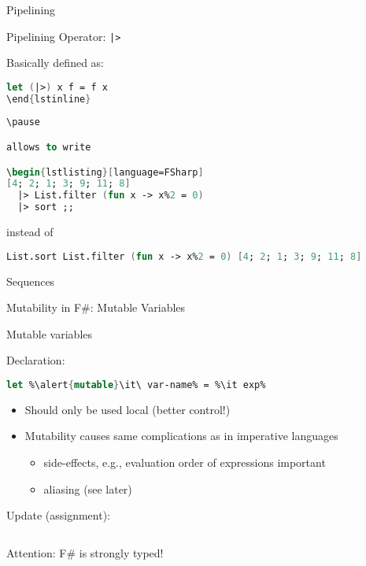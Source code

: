 \documentclass{beamer}
\newcommand{\Blue}[1]{\color{blue}#1\color{black}}
\begin{document}
\begin{frame}[fragile]{Pipelining}

Pipelining Operator: \lstinline!|>!

Basically defined as:
\begin{lstlisting}[language=FSharp]
let (|>) x f = f x 
\end{lstinline}
 
\pause

allows to write

\begin{lstlisting}[language=FSharp]
[4; 2; 1; 3; 9; 11; 8] 
  |> List.filter (fun x -> x%2 = 0) 
  |> sort ;;
\end{lstlisting}

instead of

\begin{lstlisting}[language=FSharp]
List.sort List.filter (fun x -> x%2 = 0) [4; 2; 1; 3; 9; 11; 8]
\end{lstlisting}
\end{frame}

\begin{frame}{Sequences}
\end{frame}



\begin{frame}[fragile]{Mutability in F\#: Mutable Variables}

\Blue{Mutable variables}

Declaration:

\begin{lstlisting}[language=FSharp, escapechar=\%]
             let %\alert{mutable}\it\ var-name% = %\it exp% 
\end{lstlisting}

\begin{itemize}
\item Should only be used local (better control!)
\item Mutability causes same complications as in imperative languages
  \begin{itemize}
    \item side-effects, e.g., evaluation order of expressions important
    \item aliasing (see later)
   \end{itemize}
\end{itemize}

\pause 

Update (assignment):
\begin{lstlisting}[language=FSharp, escapechar=\%]
  %\it var-name% <- %\it new-value%
\end{lstlisting}

\pause 

\begin{center}
\alert{Attention: F\# is strongly typed!}
\end{center}

\end{frame}
\end{document}
